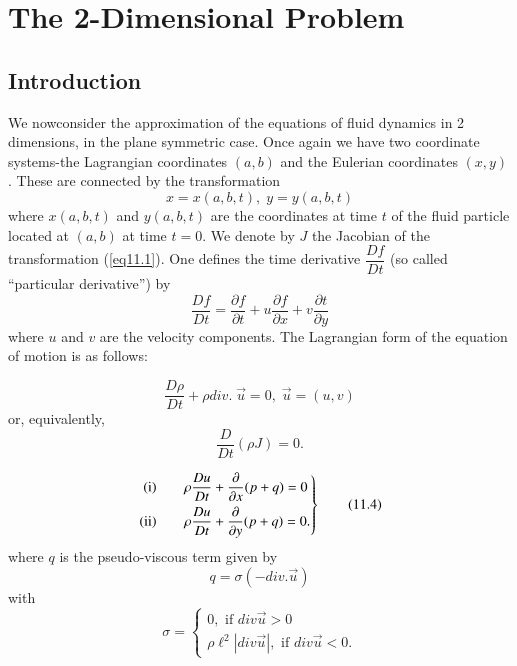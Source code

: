 
\chapter{The 2-Dimensional Problem}\label{chap11}

\section{Introduction}\label{chap11:sec11.1}

We now\pageoriginale consider the approximation of the equations of
fluid dynamics in 2 dimensions, in the plane symmetric case. Once
again we have two coordinate systems-the Lagrangian coordinates
$(a,b)$ and the Eulerian coordinates $(x,y)$. These are connected by
the transformation 
\begin{equation*}
x = x(a, b , t), \;  y = y (a,b,t)\tag{11.1}\label{eq11.1}
\end{equation*}
where $x(a,b,t)$ and $y(a,b,t)$ are the coordinates at time $t$ of the
fluid particle located at $(a,b)$ at time $t =0$. We denote by $J$ the
Jacobian of the transformation (\ref{eq11.1}).  One defines the time
derivative $\dfrac{Df}{Dt}$ (so called ``particular derivative'') by  
\begin{equation*}
\frac{Df}{Dt} = \frac{\partial f}{\partial t} + u \frac{\partial
  f}{\partial x} + v \frac{\partial t}{\partial y}
\tag{11.2}\label{eq11.2} 
\end{equation*}
where $u$ and $v$ are the velocity components. The Lagrangian form of
the equation of motion is as follows: 

\medskip
{}
\begin{equation*}
\frac{D\rho}{Dt} + \rho div. \; \vec{u} = 0, \; \vec{u} = (u,v) \tag{11.3}\label{eq11.3}
\end{equation*}
or, equivalently,
\begin{equation*}
\frac{D}{Dt} (\rho J) = 0. \tag*{$(11.3')$}\label{eq11.3'}
\end{equation*}

\medskip
{}
\begin{equation*}
\left. 
\begin{aligned}
{\rm (i)} & \qquad \rho \frac{Du}{Dt} + \frac{\partial}{\partial x} (p+q) = 0\\
{\rm (ii)} & \qquad \rho \frac{Du}{Dt} + \frac{\partial}{\partial y} (p+q) = 0.\\
\end{aligned}
\right\}
\tag{11.4}\label{eq11.4}
\end{equation*}
where $q$ is the pseudo-viscous term given by 
\begin{equation*}
q = \sigma (-div. \vec{u})\tag{11.5}\label{eq11.5}
\end{equation*}\pageoriginale 
with 
\begin{equation*}
\sigma = 
\begin{cases}
0, \text{ if } div \vec{u} > 0\\
\rho \ell^2 |div \vec{u}|, \text{ if } div \vec{u} < 0. 
\end{cases}\tag{11.6}\label{eq11.6}
\end{equation*}

